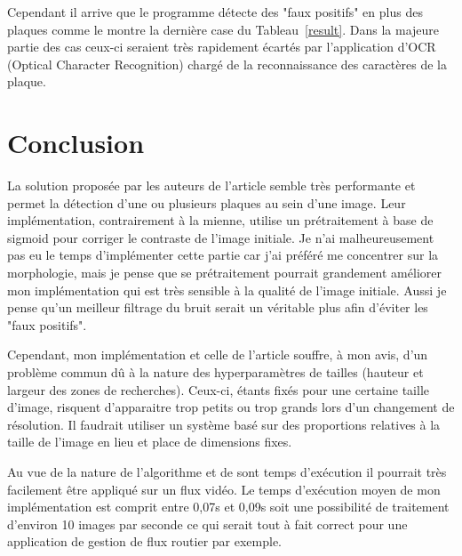 \documentclass[a4paper,10pt,twocolumn]{article}
\begin{document}
Cependant il arrive que le programme détecte des "faux positifs" en plus des plaques comme le montre la dernière case du Tableau~\ref{result}. Dans la majeure partie des cas ceux-ci seraient très rapidement écartés par l'application d'OCR (Optical Character Recognition) chargé de la reconnaissance des caractères de la plaque.

\section{Conclusion}
La solution proposée par les auteurs de l'article semble très performante et permet la détection d'une ou plusieurs plaques au sein d'une image. Leur implémentation, contrairement à la mienne, utilise un prétraitement à base de sigmoid pour corriger le contraste de l'image initiale. Je n'ai malheureusement pas eu le temps d'implémenter cette partie car j'ai préféré me concentrer sur la morphologie, mais je pense que se prétraitement pourrait grandement améliorer mon implémentation qui est très sensible à la qualité de l'image initiale. Aussi je pense qu'un meilleur filtrage du bruit serait un véritable plus afin d'éviter les "faux positifs".

Cependant, mon implémentation et celle de l'article souffre, à mon avis, d'un problème commun dû à la nature des hyperparamètres de tailles (hauteur et largeur des zones de recherches). Ceux-ci, étants fixés pour une certaine taille d'image, risquent d'apparaitre trop petits ou trop grands lors d'un changement de résolution. Il faudrait utiliser un système basé sur des proportions relatives à la taille de l'image en lieu et place de dimensions fixes. 

Au vue de la nature de l'algorithme et de sont temps d'exécution il pourrait très facilement être appliqué sur un flux vidéo. Le temps d'exécution moyen de mon implémentation est comprit entre 0,07s et 0,09s soit une possibilité de traitement d'environ 10 images par seconde ce qui serait tout à fait correct pour une application de gestion de flux routier par exemple. 
\end{document}
